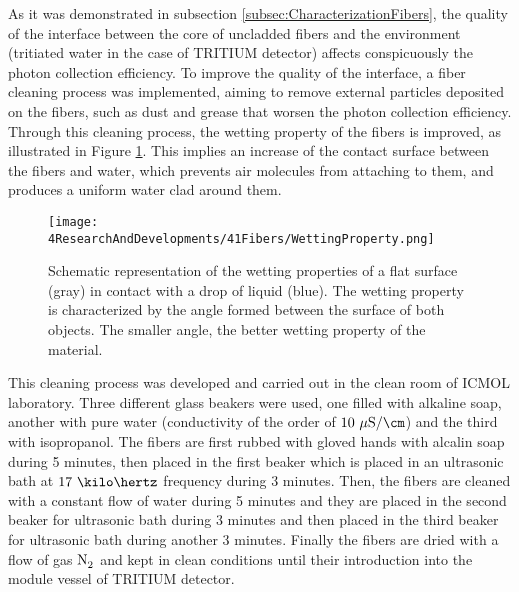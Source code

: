 
As it was demonstrated in subsection \ref{subsec:CharacterizationFibers}, the quality of the interface between the core of uncladded fibers and the environment (tritiated water in the case of TRITIUM detector) affects conspicuously the photon collection efficiency. To improve the quality of the interface, a fiber cleaning process was implemented, aiming to remove external particles deposited on the fibers, such as dust and grease that worsen the photon collection efficiency.  Through this cleaning process, the wetting property of the fibers is improved, as illustrated in Figure \ref{fig:WettingProperty}. This implies an increase of the contact surface between the fibers and water, which prevents air molecules from attaching to them, and produces a uniform water clad around them.


\begin{figure}[h]
\centering
\texttt{[image: 4ResearchAndDevelopments/41Fibers/WettingProperty.png]}
\caption{Schematic representation of the wetting properties of a flat surface (gray) in contact with a drop of liquid (blue). The wetting property is characterized by the angle formed between the surface of both objects. The smaller angle, the better wetting property of the material. \cite{WettingProperty}\label{fig:WettingProperty}}
\end{figure}

This cleaning process  was developed and carried out in the clean room of ICMOL laboratory. Three different glass beakers were used, one filled with alkaline soap, another with pure water (conductivity of the order of $10~\mu\text{S}/\cm$) and the third with isopropanol. The fibers are first rubbed with gloved hands with alcalin soap during 5 minutes, then placed in the first beaker which is placed in an ultrasonic bath at $17~\kilo\hertz$ frequency during 3 minutes. Then, the fibers are cleaned with a constant flow of water during 5 minutes and they are placed in the second beaker for ultrasonic bath during 3 minutes and then placed in the third beaker for ultrasonic bath during another 3 minutes. Finally the fibers are dried with a flow of gas $\ce{N_2}$ and kept in clean conditions until their introduction into the module vessel of TRITIUM detector.

